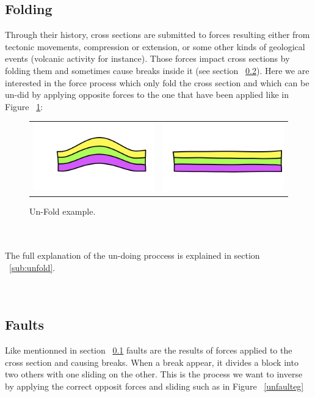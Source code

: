 \documentclass[12pt, a4paper]{report} %
\begin{document}
\subsection{Folding}
\label{sub:fold}
Through their history, cross sections are submitted to forces resulting either from tectonic movements, compression or extension, or some other kinds of geological events (volcanic activity for instance). Those forces impact cross sections by folding them and sometimes cause breaks inside it (see section ~\ref{sub:fault}). Here we are interested in the force process which only fold the cross section and which can be un-did by applying opposite forces to the one that have been applied like in Figure ~\ref{unfoldeg}:
\begin{figure}[H]
\centering
\begin{tabular}{@{}cc@{}}
\includegraphics[width=.35\textwidth]{unFoldDescription0.png}&
\includegraphics[width=.35\textwidth]{unFoldDescription1.png}\\
\end{tabular}
\caption{Un-Fold example.}
\label{unfoldeg}
\end{figure}\\\\
The full explanation of the un-doing proccess is explained in section ~\ref{sub:unfold}.
\\\\\
\subsection{Faults}
\label{sub:fault}
Like mentionned in section ~\ref{sub:fold} faults are the results of forces applied to the cross section and causing breaks. When a break appear, it divides a block into two others with one sliding on the other. This is the process we want to inverse by applying the correct opposit forces and sliding such as in Figure ~\ref{unfaulteg}
\end{document}
